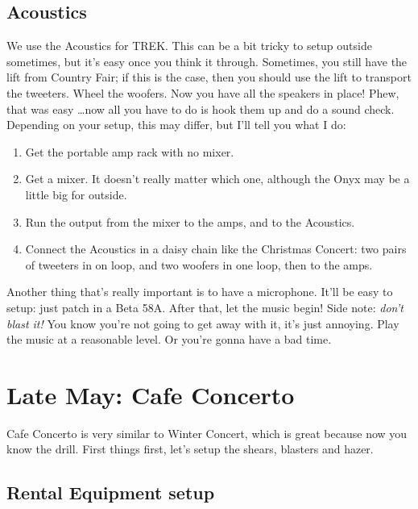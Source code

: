 \documentclass[letterpaper,10pt,oneside,headsepline]{scrreprt}
\begin{document}
\subsection{Acoustics}
We use the Acoustics for TREK. This can be a bit tricky to setup outside sometimes, but it's easy once you think it through. Sometimes, you still have the lift from Country Fair; if this is the case, then you should use the lift to transport the tweeters. Wheel the woofers. Now you have all the speakers in place! Phew, that was easy \ldots now all you have to do is hook them up and do a sound check. Depending on your setup, this may differ, but I'll tell you what I do:
\begin{enumerate}
\item Get the portable amp rack with no mixer.
\item Get a mixer. It doesn't really matter which one, although the Onyx may be a little big for outside.
\item Run the output from the mixer to the amps, and to the Acoustics. 
\item Connect the Acoustics in a daisy chain like the Christmas Concert: two pairs of tweeters in on loop, and two woofers in one loop, then to the amps.
\end{enumerate} 
Another thing that's really important is to have a microphone. It'll be easy to setup: just patch in a Beta 58A. After that, let the music begin! Side note: \textit{don't blast it!} You know you're not going to get away with it, it's just annoying. Play the music at a reasonable level. Or you're gonna have a bad time. 

\section{Late May: Cafe Concerto}
Cafe Concerto is very similar to Winter Concert, which is great because now you know the drill. First things first, let's setup the shears, blasters and hazer.

\subsection{Rental Equipment setup}
%

\end{document}

